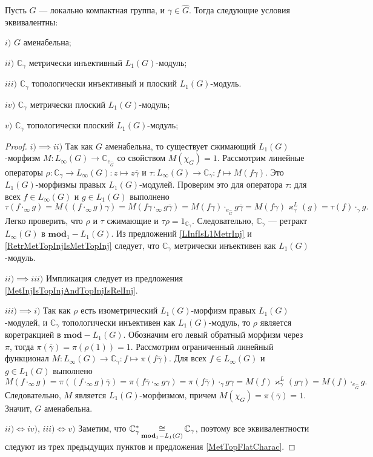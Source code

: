 \begin{proposition}\label{OneDimL1ModMetTopInjFlatCharac} Пусть $G$ --- локально компактная группа, и $\gamma\in\widehat{G}$. Тогда следующие условия эквивалентны: 

$i)$ $G$ аменабельна;

$ii)$ $\mathbb{C}_\gamma$ метрически инъективный $L_1(G)$-модуль;

$iii)$ $\mathbb{C}_\gamma$ топологически инъективный и плоский $L_1(G)$-модуль.

$iv)$ $\mathbb{C}_\gamma$ метрически плоский $L_1(G)$-модуль;

$v)$ $\mathbb{C}_\gamma$ топологически плоский $L_1(G)$-модуль;

\end{proposition}
\begin{proof} 
$i)$$\implies$$ ii)$ Так как $G$ аменабельна, то существует сжимающий $L_1(G)$-морфизм $M:L_\infty(G)\to\mathbb{C}_{e_{\widehat{G}}}$ со свойством $M(\chi_G)=1$. Рассмотрим линейные операторы $\rho:\mathbb{C}_\gamma\to L_\infty(G):z\mapsto z\overline{\gamma}$ и $\tau:L_\infty(G)\to\mathbb{C}_\gamma:f\mapsto M(f\gamma)$. Это $L_1(G)$-морфизмы  правых $L_1(G)$-модулей. Проверим это для оператора $\tau$: для всех $f\in L_\infty(G)$ и $g\in L_1(G)$ выполнено
$$
\tau(f\cdot_\infty g)
=M((f\cdot_\infty g)\gamma)
=M(f\gamma\cdot_\infty g\overline{\gamma})
=M(f\gamma)\cdot_{e_{\widehat{G}}} g\overline{\gamma}
=M(f\gamma)\varkappa_\gamma^L(g)
=\tau(f)\cdot_{\gamma} g.
$$  
Легко проверить, что $\rho$ и $\tau$ сжимающие и $\tau\rho=1_{\mathbb{C}_\gamma}$. Следовательно, $\mathbb{C}_\gamma$ --- ретракт $L_\infty(G)$ в $\mathbf{mod}_1-L_1(G)$. Из предложений \ref{LInfIsL1MetrInj} и \ref{RetrMetTopInjIsMetTopInj} следует, что $\mathbb{C}_\gamma$ метрически инъективен как $L_1(G)$-модуль.

$ii)$$\implies$$ iii)$ Импликация следует из предложения \ref{MetInjIsTopInjAndTopInjIsRelInj}.

$iii)$$ \implies$$ i)$ Так как $\rho$ есть изометрический $L_1(G)$-морфизм правых $L_1(G)$-модулей, и $\mathbb{C}_\gamma$ топологически инъективен как $L_1(G)$-модуль, то $\rho$ является коретракцией в $\mathbf{mod}-L_1(G)$. Обозначим его левый обратный морфизм через $\pi$, тогда $\pi(\overline{\gamma})=\pi(\rho(1))=1$. Рассмотрим ограниченный линейный функционал $M:L_\infty(G)\to\mathbb{C}_\gamma:f\mapsto \pi(f\overline{\gamma})$. Для всех $f\in L_\infty(G)$ и $g\in L_1(G)$ выполнено
$$
M(f\cdot_\infty g)
=\pi((f\cdot_\infty g)\overline{\gamma})
=\pi(f\overline{\gamma}\cdot_\infty g\gamma)
=\pi(f\overline{\gamma})\cdot_{\gamma} g\gamma
=M(f)\varkappa_\gamma^L(g\gamma)
=M(f)\cdot_{e_{\widehat{G}}}g.
$$
Следовательно, $M$ является $L_1(G)$-морфизмом, причем $M(\chi_G)=\pi(\overline{\gamma})=1$. Значит, $G$ аменабельна.

$ii)$$\Longleftrightarrow$$iv)$, $iii)$$\Longleftrightarrow$$v)$ Заметим, что $\mathbb{C}_\gamma^*\mathop{\mathbin{\cong}}\limits_{\mathbf{mod}_1-L_1(G)}\mathbb{C}_\gamma$, поэтому все эквивалентности следуют из трех предыдущих пунктов и предложения \ref{MetTopFlatCharac}.
\end{proof}

